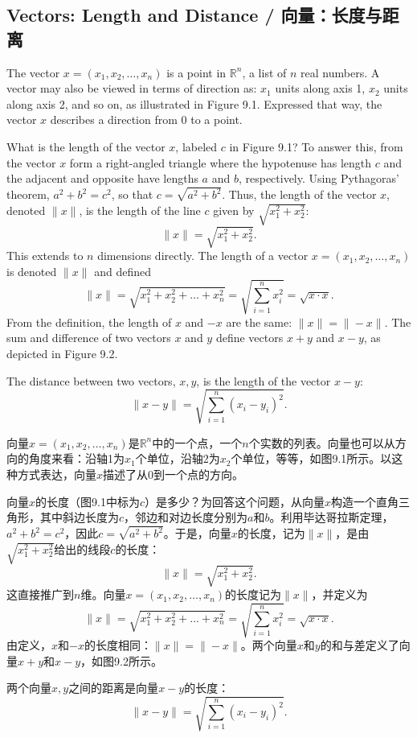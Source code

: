 \subsection{Vectors: Length and Distance / 向量：长度与距离}

\begin{original}
The vector $x = (x_1, x_2, \dots, x_n)$ is a point in $\mathbb{R}^n$, a list of $n$ real numbers. A vector may also be viewed in terms of direction as: $x_1$ units along axis 1, $x_2$ units along axis 2, and so on, as illustrated in Figure 9.1. Expressed that way, the vector $x$ describes a direction from 0 to a point.

What is the length of the vector $x$, labeled $c$ in Figure 9.1? To answer this, from the vector $x$ form a right-angled triangle where the hypotenuse has length $c$ and the adjacent and opposite have lengths $a$ and $b$, respectively. Using Pythagoras' theorem, $a^2 + b^2 = c^2$, so that $c = \sqrt{a^2 + b^2}$. Thus, the length of the vector $x$, denoted $\|x\|$, is the length of the line $c$ given by $\sqrt{x_1^2 + x_2^2}$:
\[
\|x\| = \sqrt{x_1^2 + x_2^2}.
\]
This extends to $n$ dimensions directly. The length of a vector $x = (x_1, x_2, \dots, x_n)$ is denoted $\|x\|$ and defined
\[
\|x\| = \sqrt{x_1^2 + x_2^2 + \dots + x_n^2} = \sqrt{\sum_{i=1}^{n} x_i^2} = \sqrt{x \cdot x}.
\]
From the definition, the length of $x$ and $-x$ are the same: $\|x\| = \|-x\|$. The sum and difference of two vectors $x$ and $y$ define vectors $x + y$ and $x - y$, as depicted in Figure 9.2.

The distance between two vectors, $x, y$, is the length of the vector $x - y$:
\[
\|x - y\| = \sqrt{\sum_{i=1}^{n} (x_i - y_i)^2}.
\]
\end{original}
\begin{translation}
向量$x = (x_1, x_2, \dots, x_n)$是$\mathbb{R}^n$中的一个点，一个$n$个实数的列表。向量也可以从方向的角度来看：沿轴1为$x_1$个单位，沿轴2为$x_2$个单位，等等，如图9.1所示。以这种方式表达，向量$x$描述了从0到一个点的方向。

向量$x$的长度（图9.1中标为$c$）是多少？为回答这个问题，从向量$x$构造一个直角三角形，其中斜边长度为$c$，邻边和对边长度分别为$a$和$b$。利用毕达哥拉斯定理，$a^2 + b^2 = c^2$，因此$c = \sqrt{a^2 + b^2}$。于是，向量$x$的长度，记为$\|x\|$，是由$\sqrt{x_1^2 + x_2^2}$给出的线段$c$的长度：
\[
\|x\| = \sqrt{x_1^2 + x_2^2}.
\]
这直接推广到$n$维。向量$x = (x_1, x_2, \dots, x_n)$的长度记为$\|x\|$，并定义为
\[
\|x\| = \sqrt{x_1^2 + x_2^2 + \dots + x_n^2} = \sqrt{\sum_{i=1}^{n} x_i^2} = \sqrt{x \cdot x}.
\]
由定义，$x$和$-x$的长度相同：$\|x\| = \|-x\|$。两个向量$x$和$y$的和与差定义了向量$x + y$和$x - y$，如图9.2所示。

两个向量$x, y$之间的距离是向量$x - y$的长度：
\[
\|x - y\| = \sqrt{\sum_{i=1}^{n} (x_i - y_i)^2}.
\]
\end{translation}


